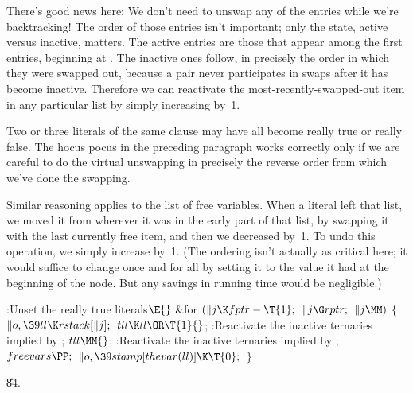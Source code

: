 There's good news here: We don't need to unswap any of the 
entries while
we're backtracking! The order of those entries isn't important; only
the state, active versus inactive, matters. The active entries are
those that appear among the first  entries, beginning at .
The inactive ones follow, in precisely the order in which they were
swapped out, because a pair never participates in swaps after it
has become inactive. Therefore we can reactivate the most-recently-swapped-out
item in any particular list by simply increasing  by~1.

Two or three literals of the same clause may have all become really
true or really false. The hocus pocus in the preceding paragraph works
correctly only if we are careful to do the virtual unswapping in
precisely the reverse order from which we've done the swapping.

Similar reasoning applies to the list of free variables. When a literal
left that list, we moved it from wherever it was in the early
part of that list, by swapping it with the last currently free item, and
then we decreased  by~1. To undo this operation, we simply
increase  by~1. (The ordering isn't actually as critical here;
it would suffice to change  once and for all by setting it to
the value it had at the beginning of the node. But any savings in
running time would be negligible.)

\Y\B\4:Unset the really true literals\X${}\E{}$\6
\&{for} ${}(\|j\K\\{fptr}-\T{1};{}$ ${}\|j\G\\{rptr};{}$ ${}\|j\MM){}$\5
${}\{{}$\1\6
${}\|o,\39\\{ll}\K\\{rstack}[\|j];{}$\6
${}\\{tll}\K\\{ll}\OR\T{1}{}$;\5
:Reactivate the inactive ternaries implied by \X;\6
${}\\{tll}\MM{}$;\5
:Reactivate the inactive ternaries implied by \X;\6
${}\\{freevars}\PP;{}$\6
${}\|o,\39\\{stamp}[\\{thevar}(\\{ll})]\K\T{0};{}$\6
\4${}\}{}$\2\par
\U84.\fi

